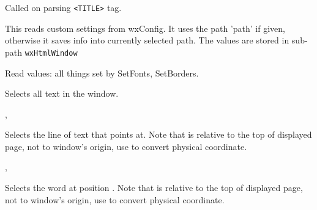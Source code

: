 \label{wxhtmlwindowonsettitle}


Called on parsing {\tt <TITLE>} tag.


\label{wxhtmlwindowreadcustomization}


This reads custom settings from wxConfig. It uses the path 'path'
if given, otherwise it saves info into currently selected path.
The values are stored in sub-path {\tt wxHtmlWindow}

Read values: all things set by SetFonts, SetBorders.




\label{wxhtmlwindowselectall}


Selects all text in the window.


,

\label{wxhtmlwindowselectline}


Selects the line of text that  points at. Note that 
is relative to the top of displayed page, not to window's origin, use
to convert physical coordinate.


,

\label{wxhtmlwindowselectword}


Selects the word at position . Note that 
is relative to the top of displayed page, not to window's origin, use
to convert physical coordinate.

